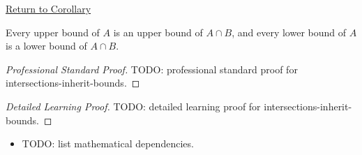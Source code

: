 \newpage
{}
\label{prf:intersections-inherit-bounds}

\begin{remark*}[Return]
\hyperref[cor:intersections-inherit-bounds]{Return to Corollary}
\end{remark*}

\begin{corollary*}
Every upper bound of $A$ is an upper bound of $A\cap B$, and every lower
bound of $A$ is a lower bound of $A\cap B$.
\end{corollary*}

\begin{proof}[Professional Standard Proof]
\LRAProofBodyStart
TODO: professional standard proof for intersections-inherit-bounds.
\end{proof}

\begin{proof}[Detailed Learning Proof]
\LRAProofBodyStart
TODO: detailed learning proof for intersections-inherit-bounds.
\end{proof}

\begin{remark*}
\end{remark*}

\begin{dependencies}
\begin{itemize}
  \item TODO: list mathematical dependencies.
\end{itemize}
\end{dependencies}

\clearpage
